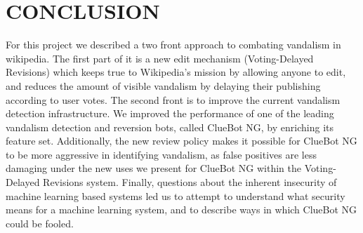 \section{CONCLUSION}
\label{s:concl}
For this project we described a two front approach to combating vandalism in wikipedia. The first part of it is a new edit mechanism (Voting-Delayed Revisions) which keeps true to Wikipedia's mission by allowing anyone to edit,  and reduces the amount of visible vandalism by delaying their publishing according to user votes. The second front is to improve the current vandalism detection infrastructure. We improved the performance of one of the leading vandalism detection and reversion bots, called ClueBot NG, by enriching its feature set.  Additionally, the new review policy makes it possible for ClueBot NG to be more aggressive in identifying vandalism, as false positives are less damaging under the new uses we present for ClueBot NG within the Voting-Delayed Revisions system. Finally, questions about the inherent insecurity of machine learning based systems led us to attempt to understand what security means for a machine learning system, and to describe ways in which ClueBot NG could be fooled.
